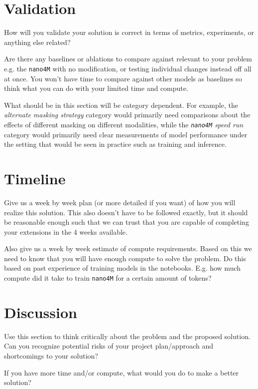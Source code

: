 \documentclass[10pt,conference,compsocconf]{IEEEtran}
\begin{document}
\section{Validation}

How will you validate your solution is correct in terms of metrics, experiments, or anything else related?

Are there any baselines or ablations to compare against relevant to your problem e.g. the \texttt{nano4M} with no modification, or testing individual changes instead off all at once. You won’t have time to compare against other models as baselines so think what you can do with your limited time and compute.

What should be in this section will be category dependent. For example, the \textit{alternate masking strategy} category would primarily need comparisons about the effects of different masking on different modalities, while the \textit{\texttt{nano4M} speed run} category would primarily need clear measurements of model performance under the setting that would be seen in practice such as training and inference.


\section{Timeline}
Give us a week by week plan (or more detailed if you want) of how you will realize this solution. This also doesn’t have to be followed exactly, but it should be reasonable enough such that we can trust that you are capable of completing your extensions in the 4 weeks available.


Also give us a week by week estimate of compute requirements. Based on this we need to know that you will have enough compute to solve the problem. Do this based on past experience of training models in the notebooks. E.g. how much compute did it take to train \texttt{nano4M} for a certain amount of tokens?



\section{Discussion}
Use this section to think critically about the problem and the proposed solution. Can you recognize potential risks of your project plan/approach and shortcomings to your solution?

If you have more time and/or compute, what would you do to make a better solution?





\end{document}
